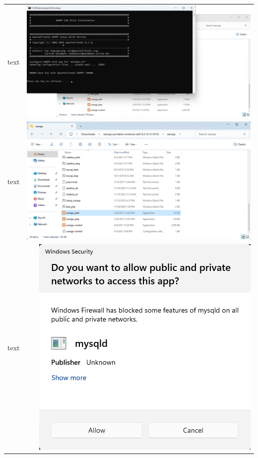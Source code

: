 \documentclass[11pt]{report}
\begin{document}
\begin{tabular}{ l r }
            text & \includegraphics[scale=1.0]{xampp09} \\
            text & \includegraphics[scale=1.0]{xampp10} \\
            text & \includegraphics[scale=1.0]{xampp11} \\

\end{tabular}
\end{document}
